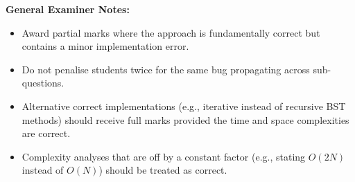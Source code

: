 \documentclass[11pt,a4paper]{article}
\begin{document}
\vspace{0.4cm}
\noindent\textbf{General Examiner Notes:}
\begin{itemize}
    \item Award partial marks where the approach is fundamentally correct but contains a minor implementation error.
    \item Do not penalise students twice for the same bug propagating across sub-questions.
    \item Alternative correct implementations (e.g., iterative instead of recursive BST methods) should receive full marks provided the time and space complexities are correct.
    \item Complexity analyses that are off by a constant factor (e.g., stating $O(2N)$ instead of $O(N)$) should be treated as correct.
\end{itemize}
\end{document}
